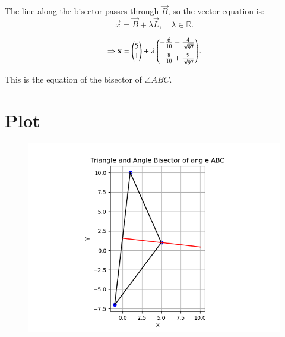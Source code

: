 \documentclass[12pt]{article}
\begin{document}
The line along the bisector passes through \(\vec{B}\), so the vector equation is:
\begin{equation}
\vec{x} = \vec{B} + \lambda \vec{L}, \quad \lambda \in \mathbb{R}.
\end{equation}

\begin{equation}
\Rightarrow \mathbf{x} = \begin{pmatrix}5 \\ 1\end{pmatrix} + \lambda \begin{pmatrix}-\frac{6}{10} - \frac{4}{\sqrt{97}} \\[6pt]
       -\frac{8}{10} + \frac{9}{\sqrt{97}} \end{pmatrix}.
\end{equation}

This is the equation of the bisector of \(\angle ABC\).

\section*{Plot}
\begin{figure}[H]
    \centering
    \includegraphics[width=1\columnwidth]{Figs/Figure_1.png}
\end{figure}
\end{document}

